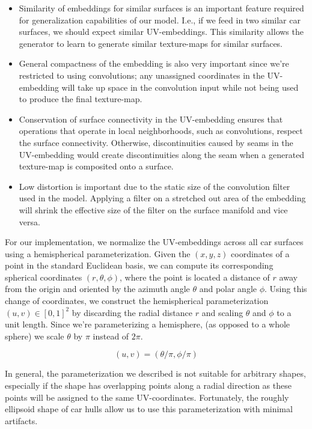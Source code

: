 \begin{itemize}
\renewcommand\labelitemi{--}
    \item Similarity of embeddings for similar surfaces is an important feature required for
        generalization capabilities of our model. I.e., if we feed in two similar car surfaces,
        we should expect similar UV-embeddings. This similarity allows the generator to
        learn to generate similar texture-maps for similar surfaces.
    \item General compactness of the embedding is also very important since we're restricted
        to using convolutions; any unassigned coordinates in the UV-embedding will take up space
        in the convolution input while not being used to produce the final texture-map.
    \item Conservation of surface connectivity in the UV-embedding ensures that operations that
        operate in local neighborhoods, such as convolutions, respect the surface connectivity.
        Otherwise, discontinuities caused by seams in the UV-embedding would create
        discontinuities along the seam when a generated texture-map is composited onto a surface.
    \item Low distortion is important due to the static size of the convolution filter used
        in the model. Applying a filter on a stretched out area of the embedding will
        shrink the effective size of the filter on the surface manifold and vice versa.
\end{itemize}

For our implementation, we normalize the UV-embeddings across all car surfaces using a
hemispherical parameterization. Given the $(x, y, z)$ coordinates of a point in the standard
Euclidean basis, we can compute its corresponding spherical coordinates $(r, \theta, \phi)$,
where the point is located a distance of $r$ away from the origin and oriented by the
azimuth angle $\theta$ and polar angle $\phi$. Using this change of coordinates, we construct
the hemispherical parameterization $(u, v) \in [0, 1]^2$ by discarding the radial distance $r$
and scaling $\theta$ and $\phi$ to a unit length. Since we're parameterizing a hemisphere,
(as opposed to a whole sphere) we scale $\theta$ by $\pi$ instead of $2 \pi$.

\begin{equation}
    (u, v) = (\theta / \pi, \phi / \pi)
\end{equation}

In general, the parameterization we described is not suitable for arbitrary shapes, especially
if the shape has overlapping points along a radial direction as these points will be assigned
to the same UV-coordinates. Fortunately, the roughly ellipsoid shape of car hulls allow us to
use this parameterization with minimal artifacts.

